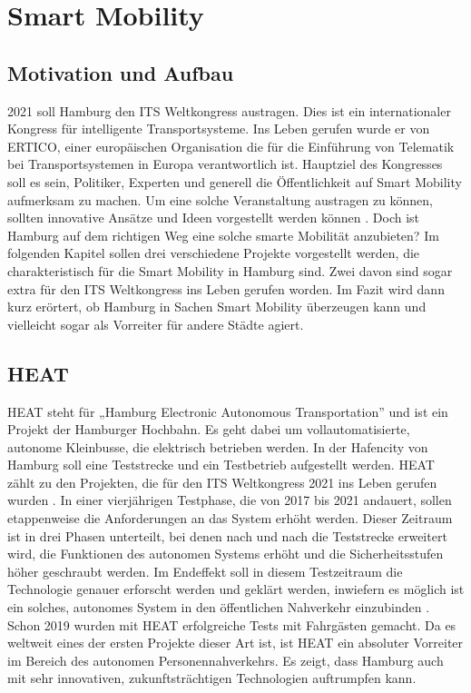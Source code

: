 \section{Smart Mobility}
\label{sec:smart_mobility}

\subsection{Motivation und Aufbau}

2021 soll Hamburg den ITS Weltkongress austragen. Dies ist ein internationaler Kongress für intelligente Transportsysteme.
Ins Leben gerufen wurde er von ERTICO, einer europäischen Organisation die für die Einführung von Telematik bei Transportsystemen in Europa verantwortlich ist.
Hauptziel des Kongresses soll es sein, Politiker, Experten und generell die Öffentlichkeit auf Smart Mobility aufmerksam zu machen.
Um eine solche Veranstaltung austragen zu können, sollten innovative Ansätze und Ideen vorgestellt werden können \autocite[vgl.][]{ITSWorldCongress.2020}.
Doch ist Hamburg auf dem richtigen Weg eine solche smarte Mobilität anzubieten?
Im folgenden Kapitel sollen drei verschiedene Projekte vorgestellt werden, die charakteristisch für die Smart Mobility in Hamburg sind.
Zwei davon sind sogar extra für den ITS Weltkongress ins Leben gerufen worden.
Im Fazit wird dann kurz erörtert, ob Hamburg in Sachen Smart Mobility überzeugen kann und vielleicht sogar als Vorreiter für andere Städte agiert. 

\subsection{HEAT}

HEAT steht für „Hamburg Electronic Autonomous Transportation” und ist ein Projekt der Hamburger Hochbahn.
Es geht dabei um vollautomatisierte, autonome Kleinbusse, die elektrisch betrieben werden. In der Hafencity von Hamburg soll eine Teststrecke und ein Testbetrieb aufgestellt werden. HEAT zählt zu den Projekten, die für den ITS Weltkongress 2021 ins Leben gerufen wurden \autocite[vgl.][]{SmartCityKompass.2020c}.
In einer vierjährigen Testphase, die von 2017 bis 2021 andauert, sollen etappenweise die Anforderungen an das System erhöht werden.
Dieser Zeitraum ist in drei Phasen unterteilt, bei denen nach und nach die Teststrecke erweitert wird, die Funktionen des autonomen Systems erhöht und die Sicherheitsstufen höher geschraubt werden.
Im Endeffekt soll in diesem Testzeitraum die Technologie genauer erforscht werden und geklärt werden, inwiefern es möglich ist ein solches, autonomes System in den öffentlichen Nahverkehr einzubinden \autocite[vgl.][]{HOCHBAHN.2020}.
Schon 2019 wurden mit HEAT erfolgreiche Tests mit Fahrgästen gemacht.
Da es weltweit eines der ersten Projekte dieser Art ist, ist HEAT ein absoluter Vorreiter im Bereich des autonomen Personennahverkehrs.
Es zeigt, dass Hamburg auch mit sehr innovativen, zukunftsträchtigen Technologien auftrumpfen kann.

